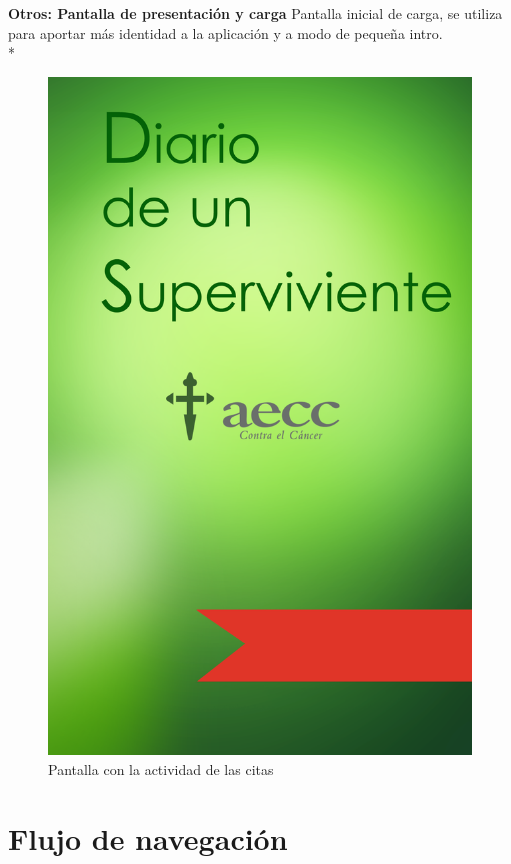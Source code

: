 \documentclass[../pfc.tex]{subfiles}
\begin{document}
			
			\textbf{Otros: Pantalla de presentación y carga}
			Pantalla inicial de carga, se utiliza para aportar más identidad a la aplicación y a modo de pequeña intro.\\*
			
			\begin{figure}[h]
				\centering
				\includegraphics[width=0.3\linewidth]{../images/flasher_pantalla_carga}
				\caption{Pantalla con la actividad de las citas}
				\label{fig:flasher_pantalla_carga}
			\end{figure}
			
			
		
	\section{Flujo de navegación}
	
	
\end{document}
